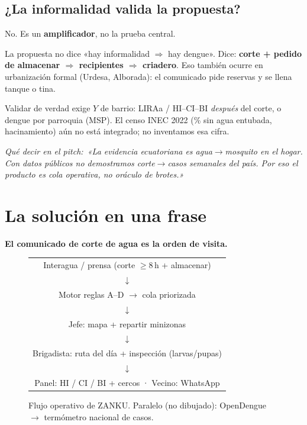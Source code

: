 \documentclass[11pt,a4paper]{article}
\newcommand{\pitch}[1]{%
  \par\vspace{2pt}\noindent
  \textit{\textcolor{azulvs}{Qué decir en el pitch:}\ #1}\par\vspace{4pt}}
\begin{document}
\subsection{¿La informalidad valida la propuesta?}

No. Es un \textbf{amplificador}, no la prueba central.

La propuesta no dice «hay informalidad $\Rightarrow$ hay dengue». Dice:
\textbf{corte + pedido de almacenar $\Rightarrow$ recipientes $\Rightarrow$
criadero}. Eso también ocurre en urbanización formal (Urdesa, Alborada):
el comunicado pide reservas y se llena tanque o tina.

Validar de verdad exige $Y$ de barrio: LIRAa / HI--CI--BI
\emph{después} del corte, o dengue por parroquia (MSP). El censo INEC
2022 (\% sin agua entubada, hacinamiento) aún no está integrado; no
inventamos esa cifra.

\pitch{«La evidencia ecuatoriana es agua$\to$mosquito en el hogar. Con
datos públicos no demostramos corte$\to$casos semanales del país. Por
eso el producto es cola operativa, no oráculo de brotes.»}

\section{La solución en una frase}

\textbf{El comunicado de corte de agua es la orden de visita.}

\begin{figure}[H]
\centering
\footnotesize
\begin{tabular}{@{}c@{}}
Interagua / prensa (corte $\geq 8$\,h + almacenar)\\
$\downarrow$\\
Motor reglas A--D $\rightarrow$ cola priorizada\\
$\downarrow$\\
Jefe: mapa + repartir minizonas\\
$\downarrow$\\
Brigadista: ruta del día + inspección (larvas/pupas)\\
$\downarrow$\\
Panel: HI / CI / BI + cercos · Vecino: WhatsApp\\
\end{tabular}
\caption{Flujo operativo de ZANKU. Paralelo (no dibujado): OpenDengue
$\rightarrow$ termómetro nacional de casos.}
\end{figure}
\end{document}
